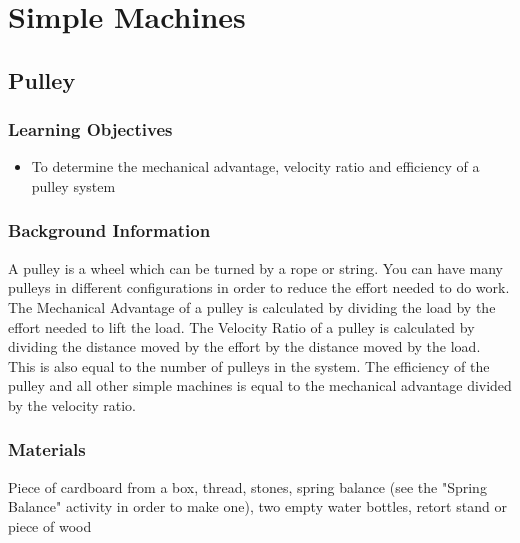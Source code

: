 \section{Simple Machines}

\subsection{Pulley}

\subsubsection*{Learning Objectives}
\begin{itemize}
\item{To determine the mechanical advantage, velocity ratio and efficiency of a pulley system}
\end{itemize}

\subsubsection*{Background Information}
A pulley is a wheel which can be turned by a rope or string.  You can have many pulleys in different configurations in order to reduce the effort needed to do work.
The Mechanical Advantage of a pulley is calculated by dividing the load by the effort needed to lift the load.
The Velocity Ratio of a pulley is calculated by dividing the distance moved by the effort by the distance moved by the load.  This is also equal to the number of pulleys in the system.
The efficiency of the pulley and all other simple machines is equal to the mechanical advantage divided by the velocity ratio.

\subsubsection*{Materials}
Piece of cardboard from a box, thread, stones, spring balance (see the "Spring Balance" activity in order to make one), two empty water bottles, retort stand or piece of wood


